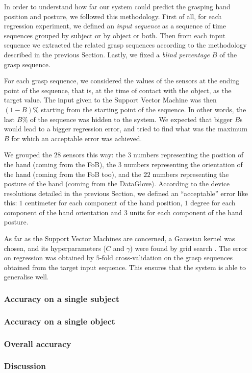 In order to understand how far our system could predict the grasping 
hand position and posture, we followed this methodology. First of all,
for each regression experiment, we defined an \emph{input sequence} as
a sequence of time sequences grouped by subject or by object or
both. Then from each input sequence we extracted the related grasp
sequences according to the methodology described in the previous
Section. Lastly, we fixed a \emph{blind percentage} $B$ of the
grasp sequence.

For each grasp sequence, we considered the values of the sensors at
the ending point of the sequence, that is, at the time of contact with
the object, as the target value. The input given to the Support Vector
Machine was then $(1-B)\%$ starting from the starting point of the
sequence. In other words, the last $B\%$ of the sequence was hidden to
the system. We expected that bigger $B$s would lead to a bigger
regression error, and tried to find what was the maximum $B$ for which
an acceptable error was achieved.

We grouped the $28$ sensors this way: the $3$ numbers representing the
position of the hand (coming from the FoB), the $3$ numbers
representing the orientation of the hand (coming from the FoB too),
and the $22$ numbers representing the posture of the hand (coming from
the DataGlove). According to the device resolutions detailed in the
previous Section, we defined an ``acceptable'' error like this: $1$
centimeter for each component of the hand position, $1$ degree for
each component of the hand orientation and $3$ units for each
component of the hand posture.

As far as the Support Vector Machines are concerned, a Gaussian kernel
was chosen, and its hyperparameters ($C$ and $\gamma$) were found by
grid search \cite{...}. The error on regression was obtained by
$5$-fold cross-validation on the grasp sequences obtained from the
target input sequence. This ensures that the system is able to
generalise well.

\subsubsection*{Accuracy on a single subject}

\subsubsection*{Accuracy on a single object}

\subsubsection*{Overall accuracy}

\subsubsection*{Discussion}

